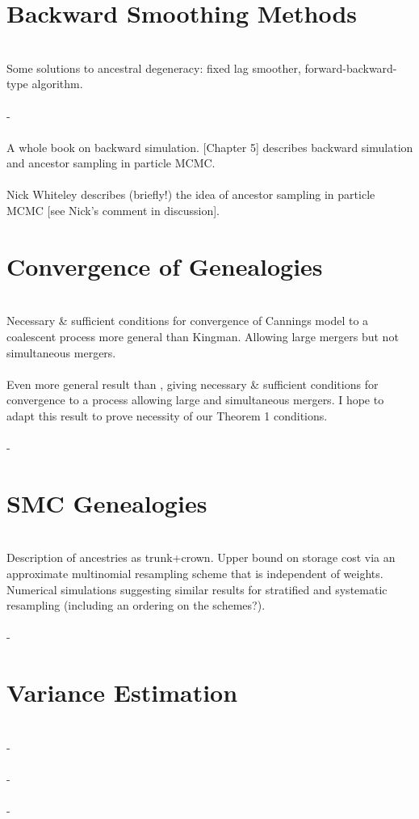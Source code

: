 \documentclass{article}
\begin{document}
\section*{Backward Smoothing Methods}

\textbf{\citet{kitagawa1996}}\\
Some solutions to ancestral degeneracy: fixed lag smoother, forward-backward-type algorithm.
\\[5pt]
\textbf{\citet{doucet2009}}\\
-
\\[5pt]
\textbf{\citet{lindsten2013}}\\
A whole book on backward simulation. [Chapter 5] describes backward simulation and ancestor sampling in particle MCMC.
\\[5pt]
\textbf{\citet{andrieu2010}}\\
Nick Whiteley describes (briefly!) the idea of ancestor sampling in particle MCMC [see Nick's comment in discussion].

\section*{Convergence of Genealogies}

\textbf{\citet{mohle1998}}\\
Necessary \& sufficient conditions for convergence of Cannings model to a coalescent process more general than Kingman. Allowing large mergers but not simultaneous mergers.
\\[5pt]
\textbf{\citet{mohle2001}}\\
Even more general result than \citet{mohle1998}, giving necessary \& sufficient conditions for convergence to a process allowing large and simultaneous mergers. I hope to adapt this result to prove necessity of our Theorem 1 conditions.
\\[5pt]
\textbf{\citet{mohle1999}}\\
-

\section*{SMC Genealogies}

\textbf{\citet{jacob2015}}\\
Description of ancestries as trunk+crown. Upper bound on storage cost via an approximate multinomial resampling scheme that is independent of weights. Numerical simulations suggesting similar results for stratified and systematic resampling (including an ordering on the schemes?). 
\\[5pt]
\textbf{\citet{koskela2018}}\\
-

\section*{Variance Estimation}

\textbf{\citet{chan2013}}\\
-
\\[5pt]
\textbf{\citet{lee2018}}\\
-
\\[5pt]
\textbf{\citet{olsson2019}}\\
-


\end{document}
